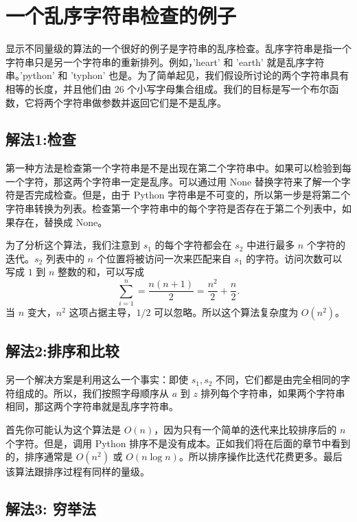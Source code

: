 \section{一个乱序字符串检查的例子}

显示不同量级的算法的一个很好的例子是字符串的乱序检查。乱序字符串是指一个字符串只是另一个字符串的重新排列。例如，'heart' 和 'earth' 就是乱序字符串。'python' 和 'typhon' 也是。为了简单起见，我们假设所讨论的两个字符串具有相等的长度，并且他们由 26 个小写字母集合组成。我们的目标是写一个布尔函数，它将两个字符串做参数并返回它们是不是乱序。


\subsection{解法1:检查}

第一种方法是检查第一个字符串是不是出现在第二个字符串中。如果可以检验到每一个字符，那这两个字符串一定是乱序。可以通过用 None 替换字符来了解一个字符是否完成检查。但是，由于 Python 字符串是不可变的，所以第一步是将第二个字符串转换为列表。检查第一个字符串中的每个字符是否存在于第二个列表中，如果存在，替换成 None。 

  


为了分析这个算法，我们注意到 $s_1$ 的每个字符都会在 $s_2$ 中进行最多 $n$ 个字符的迭代。$s_2$ 列表中的 $n$ 个位置将被访问一次来匹配来自 $s_1$ 的字符。访问次数可以写成 $1$ 到 $n$ 整数的和，可以写成 
$$
\sum_{i=1}^n = \frac{n(n+1)}{2}=\frac{n^2}{2}+\frac{n}{2}.
$$
当 $n$ 变大，$n^2$ 这项占据主导，$1/2$ 可以忽略。所以这个算法复杂度为 $O(n^2 )$。


\subsection{解法2:排序和比较}

另一个解决方案是利用这么一个事实：即使 $s_1,s_2$ 不同，它们都是由完全相同的字符组成的。所以，我们按照字母顺序从 $a$ 到 $z$ 排列每个字符串，如果两个字符串相同，那这两个字符串就是乱序字符串。 

  

首先你可能认为这个算法是 $O(n)$，因为只有一个简单的迭代来比较排序后的 $n$ 个字符。但是，调用 Python 排序不是没有成本。正如我们将在后面的章节中看到的，排序通常是 $O(n^2)$ 或 $O(n\log n)$。所以排序操作比迭代花费更多。最后该算法跟排序过程有同样的量级。


\subsection{解法3: 穷举法}

